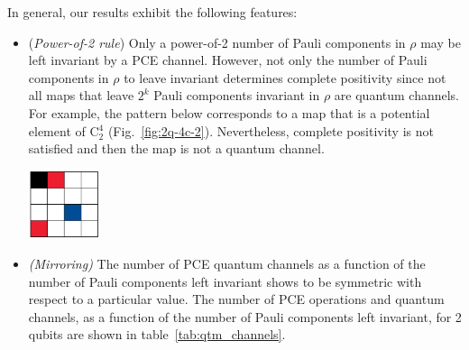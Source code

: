 \documentclass[11pt,dvipsnames]{article} %
\newcommand{\fref}[1]{fig.~\ref{#1}}
\newcommand{\tref}[1]{table~\ref{#1}}
\newcommand{\Fref}[1]{Fig.~\ref{#1}}
\newcommand{\1}{\mathds{1}}
\begin{document}
In general, our results exhibit the following features:
\begin{itemize}
\item (\textit{Power-of-2 rule})
Only a power-of-2 number of Pauli components in $\rho$ 
may be left invariant by a PCE channel. 
However, not only the number of Pauli components in $\rho$ 
to leave invariant determines complete positivity since
not all maps that leave $2^{k}$ Pauli components invariant in $\rho$
are quantum channels. For example, the pattern below corresponds 
to a map that is a potential element of C${}_2^4$ (\Fref{fig:2q-4c-2}).
Nevertheless, complete positivity is not satisfied 
and then the map is not a quantum channel. 
\begin{center}
	\includegraphics[height=2cm]{not-cc}
\end{center}

\item \textit{(Mirroring)}
The number of PCE quantum channels as a function of the number of Pauli 
components left invariant shows to be symmetric with respect to a
particular value. 
The number of PCE operations and quantum channels,
as a function of the number of Pauli components left invariant, 
for 2 qubits are shown in \tref{tab:qtm_channels}.

%


\end{itemize}
\end{document}
